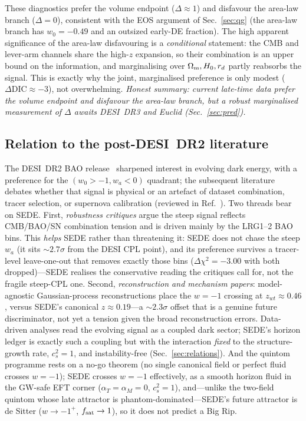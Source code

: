 These diagnostics prefer the volume endpoint ($\Delta\approx1$) and disfavour the area-law branch
($\Delta=0$), consistent with the EOS argument of Sec.~\ref{sec:qg} (the area-law branch has
$w_0=-0.49$ and an outsized early-DE fraction). The high apparent significance of the area-law
disfavouring is a \emph{conditional} statement: the CMB and lever-arm channels share the high-$z$
expansion, so their combination is an upper bound on the information, and marginalising over $\Omega_{\mathrm m},H_0,
r_d$ partly reabsorbs the signal. This is exactly why the joint, marginalised preference is only modest
($\Delta\mathrm{DIC}\approx-3$), not overwhelming. \emph{Honest summary: current late-time data prefer
the volume endpoint and disfavour the area-law branch, but a robust marginalised measurement of
$\Delta$ awaits DESI~DR3 and Euclid (Sec.~\ref{sec:pred}).}

\subsection{Relation to the post-DESI~DR2 literature}
The DESI~DR2 BAO release~\cite{DESI:2025zgx} sharpened interest in evolving dark energy, with a
preference for the $(w_0>-1,w_a<0)$ quadrant; the subsequent literature debates whether that signal is
physical or an artefact of dataset combination, tracer selection, or supernova calibration (reviewed in
Ref.~\cite{Turyshev:2026ewm}). Two threads bear on SEDE. First, \emph{robustness critiques} argue the
steep signal reflects CMB/BAO/SN combination tension and is driven mainly by the LRG1--2 BAO bins. This
\emph{helps} SEDE rather than threatening it: SEDE does not chase the steep $w_a$ (it sits
$\sim2.7\sigma$ from the DESI CPL point), and its preference survives a tracer-level leave-one-out that
removes exactly those bins ($\Delta\chi^2=-3.00$ with both dropped)---SEDE realises the conservative
reading the critiques call for, not the fragile steep-CPL one. Second, \emph{reconstruction and
mechanism papers}: model-agnostic Gaussian-process reconstructions place the $w=-1$ crossing at
$z_{wt}\approx0.46$, versus SEDE's canonical $z\approx0.19$---a $\sim2.3\sigma$ offset that is a
genuine future discriminator, not yet a tension given the broad reconstruction errors. Data-driven
analyses read the evolving signal as a coupled dark sector; SEDE's horizon ledger is exactly such a
coupling but with the interaction \emph{fixed} to the structure-growth rate, $c_s^2=1$, and
instability-free (Sec.~\ref{sec:relations}). And the quintom programme rests on a no-go theorem (no
single canonical field or perfect fluid crosses $w=-1$); SEDE crosses $w=-1$ effectively, as a smooth
horizon fluid in the GW-safe EFT corner ($\alpha_T=\alpha_M=0$, $c_s^2=1$), and---unlike the two-field
quintom whose late attractor is phantom-dominated---SEDE's future attractor is de Sitter
($w\to-1^+$, $f_{\mathrm{sat}}\to1$), so it does not predict a Big Rip.

